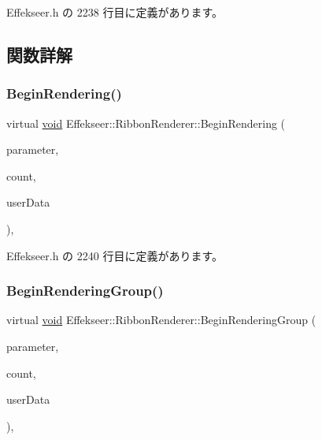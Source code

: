  Effekseer.\+h の 2238 行目に定義があります。



\subsection{関数詳解}
\mbox{\label{class_effekseer_1_1_ribbon_renderer_a9a41bef1c1c28eba5b331d72e1e4e38b}} 
\subsubsection{\texorpdfstring{Begin\+Rendering()}{BeginRendering()}}
{\footnotesize\ttfamily virtual \mbox{\hyperlink{namespace_effekseer_ab34c4088e512200cf4c2716f168deb56}{void}} Effekseer\+::\+Ribbon\+Renderer\+::\+Begin\+Rendering (\begin{DoxyParamCaption}\item[{const \mbox{\hyperlink{struct_effekseer_1_1_ribbon_renderer_1_1_node_parameter}{Node\+Parameter}} \&}]{parameter,  }\item[{int32\+\_\+t}]{count,  }\item[{\mbox{\hyperlink{namespace_effekseer_ab34c4088e512200cf4c2716f168deb56}{void}} $\ast$}]{user\+Data }\end{DoxyParamCaption})\hspace{0.3cm}{\ttfamily [inline]}, {\ttfamily [virtual]}}



 Effekseer.\+h の 2240 行目に定義があります。

\mbox{\label{class_effekseer_1_1_ribbon_renderer_aff959e008c9c35c170ea835eb4a66b35}} 
\subsubsection{\texorpdfstring{Begin\+Rendering\+Group()}{BeginRenderingGroup()}}
{\footnotesize\ttfamily virtual \mbox{\hyperlink{namespace_effekseer_ab34c4088e512200cf4c2716f168deb56}{void}} Effekseer\+::\+Ribbon\+Renderer\+::\+Begin\+Rendering\+Group (\begin{DoxyParamCaption}\item[{const \mbox{\hyperlink{struct_effekseer_1_1_ribbon_renderer_1_1_node_parameter}{Node\+Parameter}} \&}]{parameter,  }\item[{int32\+\_\+t}]{count,  }\item[{\mbox{\hyperlink{namespace_effekseer_ab34c4088e512200cf4c2716f168deb56}{void}} $\ast$}]{user\+Data }\end{DoxyParamCaption})\hspace{0.3cm}{\ttfamily [inline]}, {\ttfamily [virtual]}}



